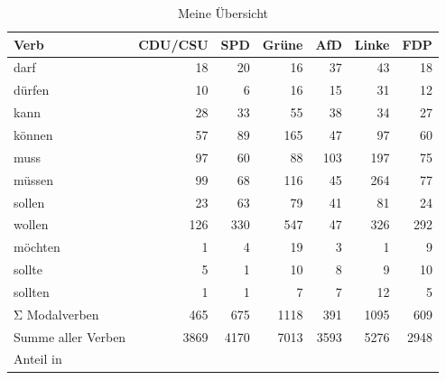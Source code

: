 \begin{table}
\caption{Meine Übersicht}
\label{tab:meine_tabelle}
\begin{tabular}{lrrrrrr}
\toprule
Verb & CDU/CSU & SPD & Grüne & AfD & Linke & FDP \\
\midrule
darf & 18 & 20 & 16 & 37 & 43 & 18 \\
dürfen & 10 & 6 & 16 & 15 & 31 & 12 \\
kann & 28 & 33 & 55 & 38 & 34 & 27 \\
können & 57 & 89 & 165 & 47 & 97 & 60 \\
muss & 97 & 60 & 88 & 103 & 197 & 75 \\
müssen & 99 & 68 & 116 & 45 & 264 & 77 \\
sollen & 23 & 63 & 79 & 41 & 81 & 24 \\
wollen & 126 & 330 & 547 & 47 & 326 & 292 \\
möchten & 1 & 4 & 19 & 3 & 1 & 9 \\
sollte & 5 & 1 & 10 & 8 & 9 & 10 \\
sollten & 1 & 1 & 7 & 7 & 12 & 5 \\
Σ Modalverben & 465 & 675 & 1118 & 391 & 1095 & 609 \\
Summe aller Verben & 3869 & 4170 & 7013 & 3593 & 5276 & 2948 \\
Anteil in %
\bottomrule
\end{tabular}
\end{table}
